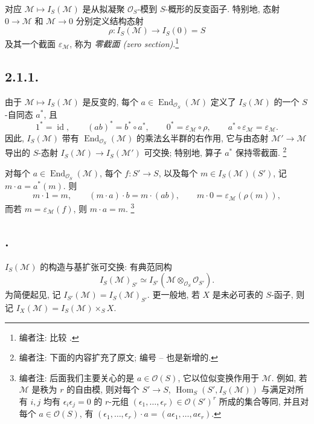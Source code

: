 对应 \(\mathcal M\mapsto I_S(\mathcal M)\) 是从拟凝聚
\(\mathcal O_S\)-模到 \(S\)-概形的反变函子.
特别地, 态射 \(0\to\mathcal M\) 和
\(\mathcal M\to0\) 分别定义结构态射
\[
  \rho:I_S(\mathcal M)\longrightarrow I_S(0)=S
\]
及其一个截面 \(\varepsilon_{\mathcal M}\), 称为
\emph{零截面 (zero section)}.\footnote{编者注: 比较
.}

\subsection*{2.1.1.}
由于 \(\mathcal M\mapsto I_S(\mathcal M)\) 是反变的, 每个
\(a\in\operatorname{End}_{\mathcal O_S}(\mathcal M)\) 定义了
\(I_S(\mathcal M)\) 的一个 \(S\)-自同态 \(a^*\), 且
\[
  1^*=\operatorname{id},\qquad (ab)^*=b^*\circ a^*,\qquad
  0^*=\varepsilon_{\mathcal M}\circ\rho,\qquad
  a^*\circ\varepsilon_{\mathcal M}=\varepsilon_{\mathcal M}.
\]
因此, \(I_S(\mathcal M)\) 带有
\(\operatorname{End}_{\mathcal O_S}(\mathcal M)\) 的乘法幺半群的右作用,
它与由态射 \(\mathcal M'\to\mathcal M\) 导出的
\(S\)-态射 \(I_S(\mathcal M)\to I_S(\mathcal M')\) 可交换;
特别地, 算子 \(a^*\) 保持零截面.
\footnote{编者注: 下面的内容扩充了原文; 编号
--
也是新增的.}

对每个 \(a\in\operatorname{End}_{\mathcal O_S}(\mathcal M)\), 每个
\(f:S'\to S\), 以及每个 \(m\in I_S(\mathcal M)(S')\), 记
\(m\cdot a=a^*(m)\). 则
\[
  m\cdot1=m,\qquad (m\cdot a)\cdot b=m\cdot(ab),\qquad
  m\cdot0=\varepsilon_{\mathcal M}(\rho(m)),
\]
而若 \(m=\varepsilon_{\mathcal M}(f)\), 则 \(m\cdot a=m\).
\footnote{编者注: 后面我们主要关心的是
\(a\in\mathcal O(S)\), 它以位似变换作用于 \(\mathcal M\).
例如, 若 \(\mathcal M\) 是秩为 \(r\) 的自由模,
则对每个 \(S'\to S\), \(\operatorname{Hom}_S(S',I_S(\mathcal M))\)
与满足对所有 \(i,j\) 均有 \(\epsilon_i\epsilon_j=0\) 的
\(r\)-元组 \((\epsilon_1,\ldots,\epsilon_r)\in\mathcal O(S')^r\)
所成的集合等同, 并且对每个 \(a\in\mathcal O(S)\), 有
\((\epsilon_1,\ldots,\epsilon_r)\cdot a
=(a\epsilon_1,\ldots,a\epsilon_r)\).}

\subsection*{.}
\(I_S(\mathcal M)\) 的构造与基扩张可交换: 有典范同构
\[
  I_S(\mathcal M)_{S'}
  \simeq I_{S'}(\mathcal M\otimes_{\mathcal O_S}\mathcal O_{S'}).
\]
为简便起见, 记 \(I_{S'}(\mathcal M)=I_S(\mathcal M)_{S'}\).
更一般地, 若 \(X\) 是未必可表的 \(S\)-函子, 则记
\(I_X(\mathcal M)=I_S(\mathcal M)\times_SX\).


